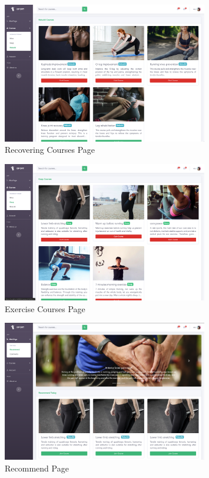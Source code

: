 \documentclass[16pt]{scrreprt}
\begin{document}
\begin{figure}[H]
    \centering
    \includegraphics[width=0.8\textwidth]{diagrams/rebuild.png}
    \caption{Recovering Courses Page}
\end{figure}

\begin{figure}[H]
    \centering
    \includegraphics[width=0.8\textwidth]{diagrams/keep.png}
    \caption{Exercise Courses Page}
\end{figure}

\begin{figure}[H]
    \centering
    \includegraphics[width=0.8\textwidth]{diagrams/recommend.png}
    \caption{Recommend Page}
\end{figure}
\end{document}
